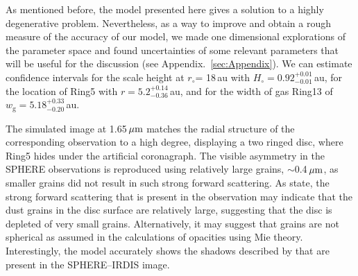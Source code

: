 \documentclass[fleqn,usenatbib,useAMS]{mnras}
\begin{document}
As mentioned before, the model presented here gives a solution to a highly degenerative problem. Nevertheless, as a way to improve and obtain a rough measure of the accuracy of our model, we made one dimensional explorations of the parameter space and found uncertainties of some relevant parameters that will be useful for the discussion (see Appendix.~\ref{sec:Appendix}). We can estimate confidence intervals for the scale height at $r_\circ$= 18\,au with $H_\circ = 0.92^{+0.01}_{-0.01}$\,au, for the location of Ring5 with $r=5.2^{+0.14}_{-0.36}$\,au, and for the width of gas Ring13 of $w_\mathrm{g} = 5.18^{+0.33}_{-0.20}$\,au.


The simulated image at 1.65\,$\hbox{$\mu$m}$ matches the radial structure of the corresponding observation to a high degree, displaying a two ringed disc, where Ring5 hides under the artificial coronagraph. The visible asymmetry in the SPHERE observations is reproduced using relatively large grains, $\sim$0.4\,$\hbox{$\mu$m}$, as smaller grains did not result in such strong forward scattering. As \citet{refId0} state, the strong forward scattering that is present in the observation may indicate that the dust grains in the disc surface are relatively large, suggesting that the disc is depleted of very small grains. Alternatively, it may suggest that grains are not spherical as assumed in the calculations of opacities using Mie theory. Interestingly, the model accurately shows the shadows described by \citet{dOrazi} that are present in the SPHERE--IRDIS image.
\end{document}
